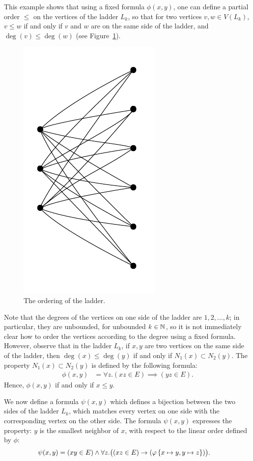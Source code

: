 \begin{example}\label{ex:ladder}
  This example shows that using a fixed formula $\phi(x,y)$, one can define a partial order $\leqslant$
  on the vertices of the ladder $L_k$, 
  so that for two vertices $v,w\in V(L_k)$,
  $v\leqslant w$ if and only if $v$ and $w$
  are on the same side of the ladder, and $\deg(v)\le \deg(w)$ (see Figure~\ref{fig:ladder-order}).
  \begin{figure}[h]
    \centering
      \includegraphics[scale=0.35,page=14]{pictures}
    \caption{The ordering of the ladder.}
    \label{fig:ladder-order}
  \end{figure}
    Note that the degrees of the vertices on one side of the ladder are $1,2,\ldots,k$; in particular, they are unbounded, for unbounded $k\in\mathbb{N}$, so it is not immediately clear how to order the vertices according to the degree using a fixed formula. However, observe that 
    in the ladder $L_k$,
    if $x,y$ are two vertices on the same side of the ladder,
    then $\deg(x)\le \deg(y)$ if and only if $N_1(x)\subset N_2(y)$. The property $N_1(x)\subset N_2(y)$ is defined by the following formula:
  \begin{align*}
    \phi(x,y)&=\forall z.(xz\in E)\implies (yz\in E).
  \end{align*}
Hence, $\phi(x,y)$ if and only if $x\leqslant y$.

We now define a formula $\psi(x,y)$ which defines a bijection between the two sides of the ladder $L_k$,
which matches every vertex on one side with the corresponding vertex on the other side. The formula $\psi(x,y)$
expresses the property: $y$ is the smallest neighbor of $x$,
with respect to the linear order defined by $\phi$:
\begin{align*}
  \psi(x,y)&=(xy\in E)\land \forall z.\big((xz\in E)\rightarrow(\varphi\,\{x\mapsto y,y\mapsto z\})\big).
\end{align*}
\end{example}



